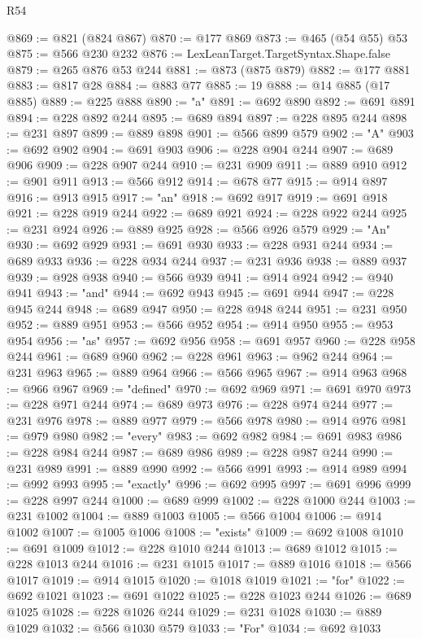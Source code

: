 \begin{lexlean}{R54}
\begin{coremodule}
@869 := @821 (@824 @867)
@870 := @177 @869
@873 := @465 (@54 @55) @53
@875 := @566 @230 @232
@876 := LexLeanTarget.TargetSyntax.Shape.false
@879 := @265 @876 @53 @244
@881 := @873 (@875 @879)
@882 := @177 @881
@883 := @817 @28
@884 := @883 @77
@885 := 19
@888 := @14 @885 (@17 @885)
@889 := @225 @888
@890 := "a"
@891 := @692 @890
@892 := @691 @891
@894 := @228 @892 @244
@895 := @689 @894
@897 := @228 @895 @244
@898 := @231 @897
@899 := @889 @898
@901 := @566 @899 @579
@902 := "A"
@903 := @692 @902
@904 := @691 @903
@906 := @228 @904 @244
@907 := @689 @906
@909 := @228 @907 @244
@910 := @231 @909
@911 := @889 @910
@912 := @901 @911
@913 := @566 @912
@914 := @678 @77
@915 := @914 @897
@916 := @913 @915
@917 := "an"
@918 := @692 @917
@919 := @691 @918
@921 := @228 @919 @244
@922 := @689 @921
@924 := @228 @922 @244
@925 := @231 @924
@926 := @889 @925
@928 := @566 @926 @579
@929 := "An"
@930 := @692 @929
@931 := @691 @930
@933 := @228 @931 @244
@934 := @689 @933
@936 := @228 @934 @244
@937 := @231 @936
@938 := @889 @937
@939 := @928 @938
@940 := @566 @939
@941 := @914 @924
@942 := @940 @941
@943 := "and"
@944 := @692 @943
@945 := @691 @944
@947 := @228 @945 @244
@948 := @689 @947
@950 := @228 @948 @244
@951 := @231 @950
@952 := @889 @951
@953 := @566 @952
@954 := @914 @950
@955 := @953 @954
@956 := "as"
@957 := @692 @956
@958 := @691 @957
@960 := @228 @958 @244
@961 := @689 @960
@962 := @228 @961
@963 := @962 @244
@964 := @231 @963
@965 := @889 @964
@966 := @566 @965
@967 := @914 @963
@968 := @966 @967
@969 := "defined"
@970 := @692 @969
@971 := @691 @970
@973 := @228 @971 @244
@974 := @689 @973
@976 := @228 @974 @244
@977 := @231 @976
@978 := @889 @977
@979 := @566 @978
@980 := @914 @976
@981 := @979 @980
@982 := "every"
@983 := @692 @982
@984 := @691 @983
@986 := @228 @984 @244
@987 := @689 @986
@989 := @228 @987 @244
@990 := @231 @989
@991 := @889 @990
@992 := @566 @991
@993 := @914 @989
@994 := @992 @993
@995 := "exactly"
@996 := @692 @995
@997 := @691 @996
@999 := @228 @997 @244
@1000 := @689 @999
@1002 := @228 @1000 @244
@1003 := @231 @1002
@1004 := @889 @1003
@1005 := @566 @1004
@1006 := @914 @1002
@1007 := @1005 @1006
@1008 := "exists"
@1009 := @692 @1008
@1010 := @691 @1009
@1012 := @228 @1010 @244
@1013 := @689 @1012
@1015 := @228 @1013 @244
@1016 := @231 @1015
@1017 := @889 @1016
@1018 := @566 @1017
@1019 := @914 @1015
@1020 := @1018 @1019
@1021 := "for"
@1022 := @692 @1021
@1023 := @691 @1022
@1025 := @228 @1023 @244
@1026 := @689 @1025
@1028 := @228 @1026 @244
@1029 := @231 @1028
@1030 := @889 @1029
@1032 := @566 @1030 @579
@1033 := "For"
@1034 := @692 @1033

\end{coremodule}
\end{lexlean}
